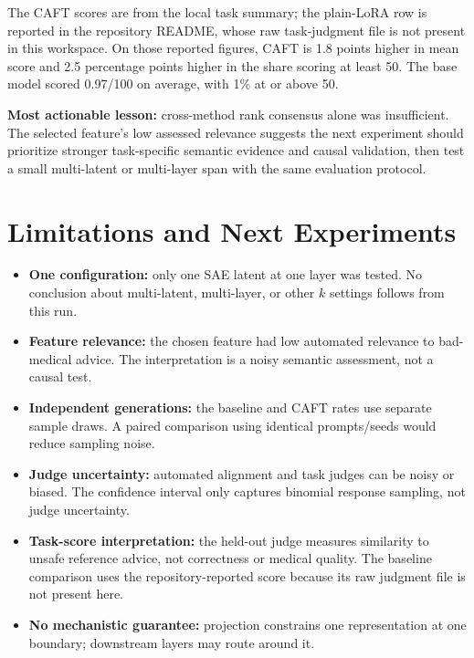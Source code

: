 \documentclass[11pt]{article}
\begin{document}
The CAFT scores are from the local task summary; the plain-LoRA row is reported in the repository README, whose raw task-judgment file is not present in this workspace. On those reported figures, CAFT is 1.8 points higher in mean score and 2.5 percentage points higher in the share scoring at least 50. The base model scored 0.97/100 on average, with 1\% at or above 50.

\begin{findingbox}
\textbf{Most actionable lesson:} cross-method rank consensus alone was insufficient. The selected feature's low assessed relevance suggests the next experiment should prioritize stronger task-specific semantic evidence and causal validation, then test a small multi-latent or multi-layer span with the same evaluation protocol.
\end{findingbox}

\newpage
\section{Limitations and Next Experiments}
\begin{itemize}
  \item \textbf{One configuration:} only one SAE latent at one layer was tested. No conclusion about multi-latent, multi-layer, or other $k$ settings follows from this run.
  \item \textbf{Feature relevance:} the chosen feature had low automated relevance to bad-medical advice. The interpretation is a noisy semantic assessment, not a causal test.
  \item \textbf{Independent generations:} the baseline and CAFT rates use separate sample draws. A paired comparison using identical prompts/seeds would reduce sampling noise.
  \item \textbf{Judge uncertainty:} automated alignment and task judges can be noisy or biased. The confidence interval only captures binomial response sampling, not judge uncertainty.
  \item \textbf{Task-score interpretation:} the held-out judge measures similarity to unsafe reference advice, not correctness or medical quality. The baseline comparison uses the repository-reported score because its raw judgment file is not present here.
  \item \textbf{No mechanistic guarantee:} projection constrains one representation at one boundary; downstream layers may route around it.
\end{itemize}
\end{document}

